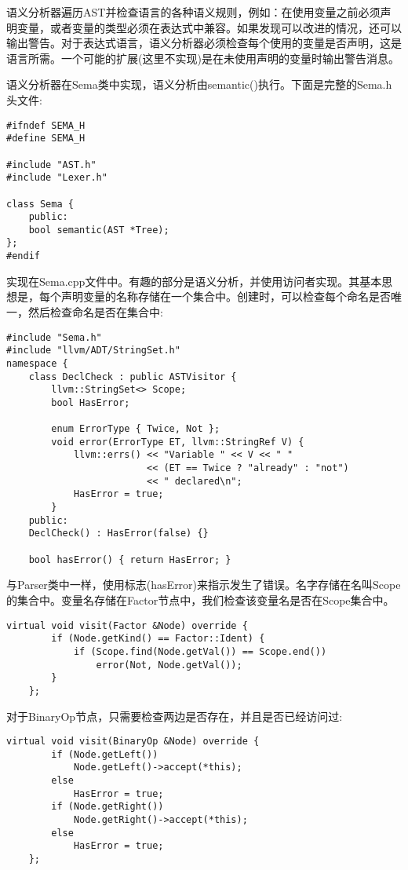 语义分析器遍历AST并检查语言的各种语义规则，例如：在使用变量之前必须声明变量，或者变量的类型必须在表达式中兼容。如果发现可以改进的情况，还可以输出警告。对于表达式语言，语义分析器必须检查每个使用的变量是否声明，这是语言所需。一个可能的扩展(这里不实现)是在未使用声明的变量时输出警告消息。\par

语义分析器在Sema类中实现，语义分析由semantic()执行。下面是完整的Sema.h头文件:\par

\begin{lstlisting}[caption={}]
#ifndef SEMA_H
#define SEMA_H

#include "AST.h"
#include "Lexer.h"

class Sema {
	public:
	bool semantic(AST *Tree);
};
#endif
\end{lstlisting}

实现在Sema.cpp文件中。有趣的部分是语义分析，并使用访问者实现。其基本思想是，每个声明变量的名称存储在一个集合中。创建时，可以检查每个命名是否唯一，然后检查命名是否在集合中:

\begin{lstlisting}[caption={}]
#include "Sema.h"
#include "llvm/ADT/StringSet.h"
namespace {
	class DeclCheck : public ASTVisitor {
		llvm::StringSet<> Scope;
		bool HasError;
		
		enum ErrorType { Twice, Not };
		void error(ErrorType ET, llvm::StringRef V) {
			llvm::errs() << "Variable " << V << " "
						 << (ET == Twice ? "already" : "not")
						 << " declared\n";
			HasError = true;
		}
	public:
	DeclCheck() : HasError(false) {}
	
	bool hasError() { return HasError; }
\end{lstlisting}

与Parser类中一样，使用标志(hasError)来指示发生了错误。名字存储在名叫Scope的集合中。变量名存储在Factor节点中，我们检查该变量名是否在Scope集合中。

\begin{lstlisting}[caption={}]
	virtual void visit(Factor &Node) override {
		if (Node.getKind() == Factor::Ident) {
			if (Scope.find(Node.getVal()) == Scope.end())
				error(Not, Node.getVal());
		}
	};
\end{lstlisting}

对于BinaryOp节点，只需要检查两边是否存在，并且是否已经访问过:

\begin{lstlisting}[caption={}]
	virtual void visit(BinaryOp &Node) override {
		if (Node.getLeft())
			Node.getLeft()->accept(*this);
		else
			HasError = true;
		if (Node.getRight())
			Node.getRight()->accept(*this);
		else
			HasError = true;
	};
\end{lstlisting}

